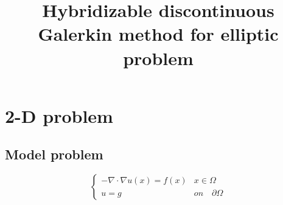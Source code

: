 \documentclass[10pt,reqno, final]{amsart}
\begin{document}

\graphicspath{{./figs/}}
\baselineskip 13pt
\title{Hybridizable discontinuous Galerkin method for elliptic problem}
\maketitle
\section{2-D problem}
\subsection{Model problem}
\begin{equation}
\label{modelproblem}
\left\{\begin{array}{ll}\displaystyle -\nabla\cdot\nabla
u(x)=f(x)&\displaystyle x\in\Omega\\
\displaystyle u=g &\displaystyle on\quad \partial\Omega
\end{array}\right.
\end{equation}
\end{document}
